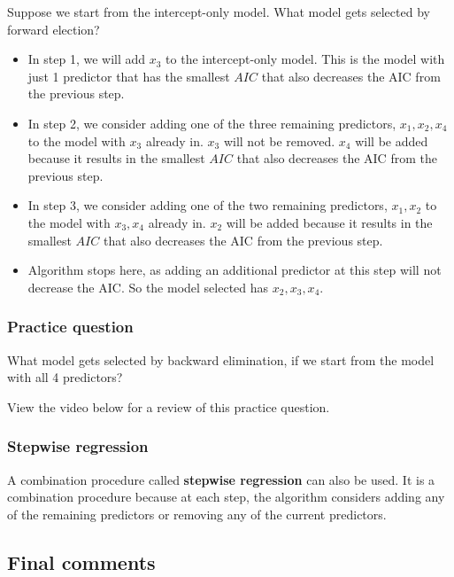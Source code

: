 \documentclass[
]{book}
\providecommand{\tightlist}{%
  \setlength{\itemsep}{0pt}\setlength{\parskip}{0pt}}
\begin{document}
Suppose we start from the intercept-only model. What model gets selected by forward election?

\begin{itemize}
\tightlist
\item
  In step 1, we will add \(x_3\) to the intercept-only model. This is the model with just 1 predictor that has the smallest \(AIC\) that also decreases the AIC from the previous step.
\item
  In step 2, we consider adding one of the three remaining predictors, \(x_1, x_2, x_4\) to the model with \(x_3\) already in. \(x_3\) will not be removed. \(x_4\) will be added because it results in the smallest \(AIC\) that also decreases the AIC from the previous step.
\item
  In step 3, we consider adding one of the two remaining predictors, \(x_1, x_2\) to the model with \(x_3, x_4\) already in. \(x_2\) will be added because it results in the smallest \(AIC\) that also decreases the AIC from the previous step.
\item
  Algorithm stops here, as adding an additional predictor at this step will not decrease the AIC. So the model selected has \(x_2, x_3, x_4\).
\end{itemize}

\hypertarget{practice-question-1}{%
\subsubsection{Practice question}\label{practice-question-1}}

What model gets selected by backward elimination, if we start from the model with all 4 predictors?

View the video below for a review of this practice question.

\hypertarget{stepwise-regression}{%
\subsubsection{Stepwise regression}\label{stepwise-regression}}

A combination procedure called \textbf{stepwise regression} can also be used. It is a combination procedure because at each step, the algorithm considers adding any of the remaining predictors or removing any of the current predictors.

\hypertarget{final-comments}{%
\subsection{Final comments}\label{final-comments}}
\end{document}

